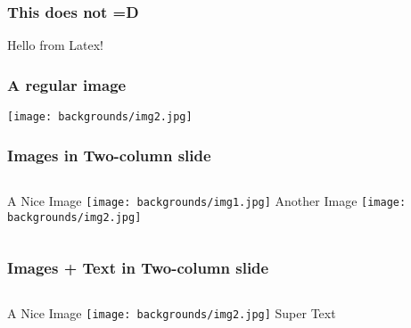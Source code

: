 \documentclass[aspectratio=169,table,xcdraw,18pt]{beamer}
\begin{document}

\begin{frame}
    \frametitle{This does not =D}
    Hello from Latex!
\end{frame}


\begin{frame}
    \frametitle{A regular image}
    \centering
    \texttt{[image: backgrounds/img2.jpg]}
\end{frame}


\begin{frame}
    \frametitle{Images in Two-column slide}
    \begin{columns}[t]
        \centering
        \Large{A Nice Image}\newline\newline
        \texttt{[image: backgrounds/img1.jpg]}
        \centering
        \Large{Another Image}\newline\newline
        \texttt{[image: backgrounds/img2.jpg]}
    \end{columns}
\end{frame}


\begin{frame}
    \frametitle{Images + Text in Two-column slide}
    \begin{columns}[t]
        \centering
        \Large{A Nice Image}\newline\newline
        \texttt{[image: backgrounds/img2.jpg]}
        \centering
        \Large{Super Text}\newline\newline
        \small{\lipsum[1][1-3]}
    \end{columns}
\end{frame}
\end{document}
